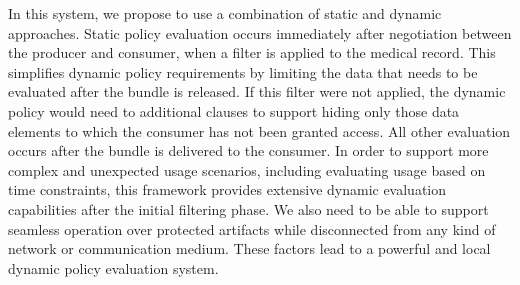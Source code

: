 \documentclass[10pt, conference, compsocconf]{IEEEtran}
\begin{document}
In this system, we propose to use a combination of static and dynamic approaches.  Static policy evaluation occurs immediately after negotiation between the producer and consumer, when a filter is applied to the medical record.  This simplifies dynamic policy requirements by limiting the data that needs to be evaluated after the bundle is released.  If this filter were not applied, the dynamic policy would need to additional clauses to support hiding only those data elements to which the consumer has not been granted access.  All other evaluation occurs after the bundle is delivered to the consumer.  In order to support more complex and unexpected usage scenarios, including evaluating usage based on time constraints, this framework provides extensive dynamic evaluation capabilities after the initial filtering phase.  We also need to be able to support seamless operation over protected artifacts while disconnected from any kind of network or communication medium.  These factors lead to a powerful and local dynamic policy evaluation system.

%
%



%
%
\end{document}

